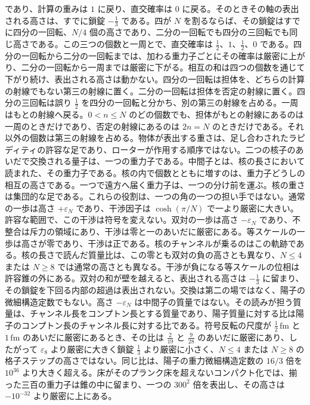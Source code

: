 \documentclass[a4paper]{article}
\begin{document}
であり、計算の重みは \(1\) に戻り、直交確率は \(0\) に戻る。そのときその軸の表出される高さは、すでに鎖錠 \(-\frac13\) である。四が \(N\) を割るならば、その鎖錠はすでに四分の一回転、\(N/4\) 個の高さであり、二分の一回転でも四分の三回転でも同じ高さである。この三つの個数と一周とで、直交確率は \(\frac12\)、\(1\)、\(\frac12\)、\(0\) である。四分の一回転から二分の一回転までは、加わる重力子ごとにその確率は厳密に上がり、二分の一回転から一周までは厳密に下がる。相互の和は四つの個数を通じて下がり続け、表出される高さは動かない。四分の一回転は担体を、どちらの計算の射線でもない第三の射線に置く。二分の一回転は担体を否定の射線に置く。四分の三回転は誤り \(\frac12\) を四分の一回転と分かち、別の第三の射線を占める。一周はもとの射線へ戻る。\(0<n\le N\) のどの個数でも、担体がもとの射線にあるのは一周のときだけであり、否定の射線にあるのは \(2n=N\) のときだけである。それ以外の個数は第三の射線を占める。物体が表出する重さは、足し合わされたラピディティの許容な足であり、ローターが作用する順序ではない。二つの核子のあいだで交換される量子は、一つの重力子である。中間子とは、核の長さにおいて読まれた、その重力子である。核の内で個数とともに増すのは、重力子どうしの相互の高さである。一つで遠方へ届く重力子は、一つの分け前を運ぶ。核の重さは集団的な足である。これらの役割は、一つの角の一つの担い手ではない。通常の一歩は高さ \(+\varepsilon_N\) であり、干渉因子は \(\cosh(\pi/N)\) で一より厳密に大きい。許容な範囲で、この干渉は符号を変えない。双対の一歩は高さ \(-\varepsilon_N\) であり、不整合は斥力の領域にあり、干渉は零と一のあいだに厳密にある。等スケールの一歩は高さが零であり、干渉は正である。核のチャンネルが乗るのはこの軌跡である。核の長さで読んだ質量比は、この零とも双対の負の高さとも異なり、\(N\le 4\) または \(N\ge 8\) では通常の高さとも異なる。干渉が負になる等スケールの位相は許容錐の外にある。双対の和が壁を越えると、表出される高さは \(-\frac13\) に留まり、その鎖錠を下回る内部の超過は表出されない。交換は第二の場ではなく、陽子の微細構造定数でもない。高さ \(-\varepsilon_N\) は中間子の質量ではない。その読みが担う質量は、チャンネル長をコンプトン長とする質量であり、陽子質量に対する比は陽子のコンプトン長のチャンネル長に対する比である。符号反転の尺度が \(\tfrac12\,\mathrm{fm}\) と \(1\,\mathrm{fm}\) のあいだに厳密にあるとき、その比は \(\tfrac{2}{19}\) と \(\tfrac{9}{28}\) のあいだに厳密にあり、したがって \(\varepsilon_8\) より厳密に大きく鎖錠 \(\tfrac13\) より厳密に小さく、\(N\le 4\) または \(N\ge 8\) の格子ステップの高さではない。同じ比は、陽子の重力微細構造定数の \(16/3\) 倍を \(10^{36}\) より大きく超える。床がそのプランク床を超えないコンパクト化では、揃った三百の重力子は錐の中に留まり、一つの \(300^2\) 倍を表出し、その高さは \(-10^{-32}\) より厳密に上にある。
\end{document}
